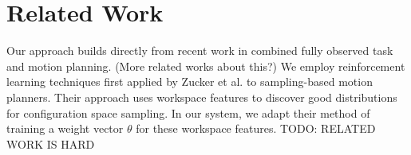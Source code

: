 \section{Related Work}
Our approach builds directly from recent work in combined fully observed
task and motion planning. (More related works about this?)
We employ reinforcement learning techniques first applied by Zucker et al.
to sampling-based motion planners. Their approach uses workspace features to
discover good distributions for configuration space sampling. In our system,
we adapt their method of training a weight vector $\theta$ for these workspace features.
TODO: RELATED WORK IS HARD